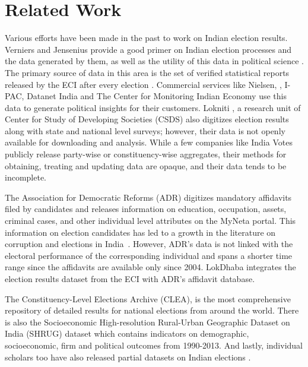 

\section{Related Work}

Various efforts have been made in the past to work on Indian election results. Verniers and Jensenius provide a good primer on Indian election processes and the data generated by them, as well as the utility of this data in political science \cite{jensenius2017studying}. The primary source of data in this area is the set of verified statistical reports released by the ECI after every election \cite{StatReportECI}. Commercial services like Nielsen, \cite{nielsen1993nielsen}, I-PAC\cite{singhelection}, Datanet India \cite{electionsInIndia} and The Center for Monitoring Indian Economy \cite{center2000cmie} use this data to generate political insights for their customers. Lokniti \cite{bose1987state,shastri2009electoral}, a research unit of Center for Study of Developing Societies (CSDS) also digitizes election results along with state and national level surveys; however, their data is not openly available for downloading and analysis. While a few companies like India Votes \cite{rana2006india,indiavotes} publicly release party-wise or constituency-wise aggregates, their methods for obtaining, treating and updating data are opaque, and their data tends to be incomplete.

The Association for Democratic Reforms (ADR) digitizes mandatory affidavits filed by candidates and releases information on education, occupation, assets, criminal cases, and other individual level attributes on the MyNeta portal. This information on election candidates has led to a growth in the literature on corruption and elections in India~\cite{vaishnav2017crime,fisman2016financial,dash2004civil, bhavnani2012using}. However, ADR's data is not linked with the electoral performance of the corresponding individual and spans a shorter time range since the affidavits are available only since 2004. LokDhaba integrates the election results dataset from the ECI with ADR's affidavit database.

The Constituency-Level Elections Archive (CLEA)\cite{kollman2011constituency}, is the most comprehensive repository of detailed results for national elections from around the world. There is also the Socioeconomic High-resolution Rural-Urban Geographic Dataset on India (SHRUG) \cite{DVN/DPESAK_2019} dataset which contains indicators on demographic, socioeconomic, firm and political outcomes from 1990-2013. And lastly, individual scholars too have also released partial datasets on Indian elections \cite{bhavnani2015socio, brass1978indian, nooruddin2008unstable, blair1973minority, heath2018electoral, chandra2016democratic, kagan2015using}. 


